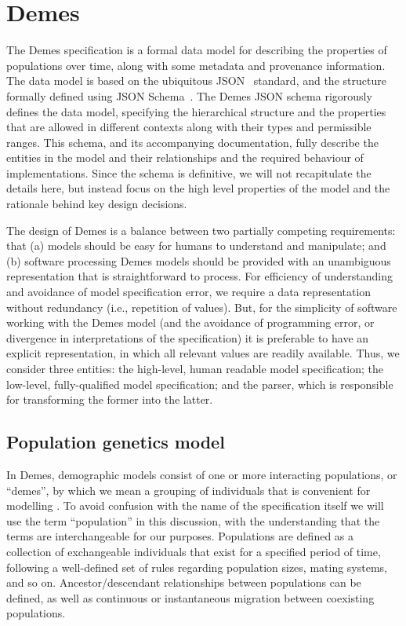 \documentclass[11pt]{article}
\begin{document}
\section*{Demes}

The Demes specification is a formal data model for describing
the properties of populations over time,
along with some metadata and provenance information.
The data model is based on the ubiquitous JSON~\citep{bray2017javascript}
standard, and the structure formally defined using
JSON Schema~\citep{wright2020json}.
The Demes JSON schema rigorously defines the data model,
specifying the hierarchical structure and the properties that are allowed in different
contexts along with their types and permissible ranges. This schema, and its
accompanying documentation, fully describe the entities in the model and their
relationships and the required behaviour of implementations. Since the
schema is definitive, we will not recapitulate the details
here, but instead focus on the high level properties of the model and
the rationale behind key design decisions.

The design of Demes is a balance between two partially competing requirements:
that (a) models should be easy for humans to understand and manipulate; and (b)
software processing Demes models should be provided with an unambiguous
representation that is straightforward to process. For efficiency of
understanding and avoidance of model specification error, we require a data
representation without redundancy (i.e., repetition of values). But, for the
simplicity of software working with the Demes model (and the avoidance of
programming error, or divergence in interpretations of the specification) it is
preferable to have an explicit representation, in which all relevant values are
readily available. Thus, we consider three entities: the high-level, human
readable model specification; the low-level, fully-qualified model
specification; and the parser, which is responsible for transforming the former
into the latter.

\subsection*{Population genetics model}

In Demes, demographic models consist of one or more interacting populations,
or ``demes'', by which we mean a grouping of individuals that is convenient
for modelling \citep{gilmour_demes_1939,gilmour_deme_1955}.
To avoid confusion with the name of the specification itself we will
use the term ``population'' in this discussion, with the understanding that the
terms are interchangeable for our purposes. Populations are defined as a
collection of exchangeable individuals that exist for a specified period of
time, following a well-defined set of rules regarding population sizes, mating
systems, and so on. Ancestor/descendant relationships between populations can
be defined, as well as continuous or instantaneous migration between coexisting
populations.
\end{document}
